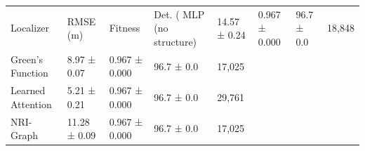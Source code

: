 \begin{tabular}{lllll}
\toprule
Localizer & RMSE (m) & Fitness & Det. (%
\midrule
MLP (no structure) & 14.57 ± 0.24 & 0.967 ± 0.000 & 96.7 ± 0.0 & 18,848 \\
Green's Function & 8.97 ± 0.07 & 0.967 ± 0.000 & 96.7 ± 0.0 & 17,025 \\
Learned Attention & 5.21 ± 0.21 & 0.967 ± 0.000 & 96.7 ± 0.0 & 29,761 \\
NRI-Graph & 11.28 ± 0.09 & 0.967 ± 0.000 & 96.7 ± 0.0 & 17,025 \\
\bottomrule
\end{tabular}

